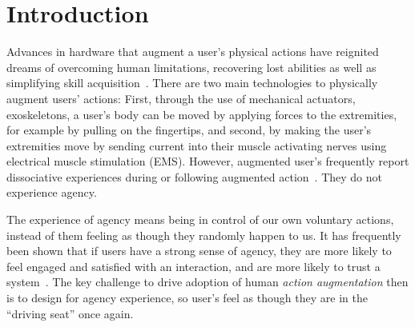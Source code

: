 \section{Introduction}

Advances in hardware that augment a user's physical actions have reignited dreams of overcoming human limitations, recovering lost abilities as well as simplifying skill acquisition~\citep{Kasahara2019-sk, Goto2020-mw}. There are two main technologies to physically augment users' actions: First, through the use of mechanical actuators, exoskeletons, a user's body can be moved by applying forces to the extremities, for example by pulling on the fingertips, and second, by making the user's extremities move by sending current into their muscle activating nerves using electrical muscle stimulation (EMS). However, augmented user's frequently report dissociative experiences during or following augmented action~\citep{}. They do not experience agency.

The experience of agency means being in control of our own voluntary actions, instead of them feeling as though they randomly happen to us. It has frequently been shown that if users have a strong sense of agency, they are more likely to feel engaged and satisfied with an interaction, and are more likely to trust a system~\citep{Berberian2012-do, Miller2007-rb}. The key challenge to drive adoption of human \textit{action augmentation} then is to design for agency experience, so user's feel as though they are in the ``driving seat'' once again.

